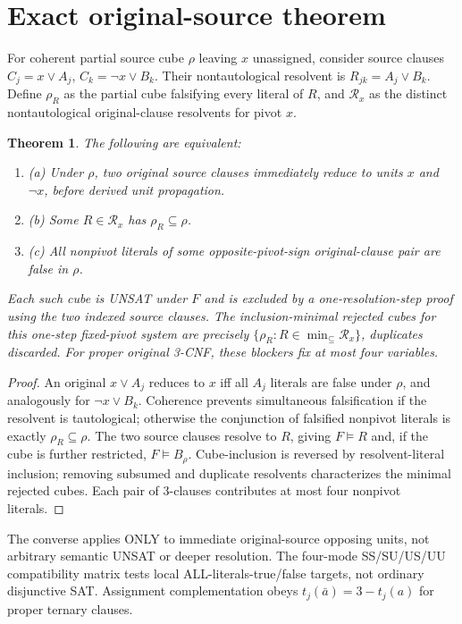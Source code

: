 \documentclass[11pt]{article}
\newtheorem{theorem}{Theorem}
\begin{document}
\section{Exact original-source theorem}
For coherent partial source cube $\rho$ leaving $x$ unassigned, consider source clauses $C_j=x\vee A_j$, $C_k=\neg x\vee B_k$. Their nontautological resolvent is $R_{jk}=A_j\vee B_k$. Define $\rho_R$ as the partial cube falsifying every literal of $R$, and $\mathcal R_x$ as the distinct nontautological original-clause resolvents for pivot $x$.
\begin{theorem}
The following are equivalent:
\begin{enumerate}
\item[] (a) Under $\rho$, two original source clauses immediately reduce to units $x$ and $\neg x$, before derived unit propagation.
\item[] (b) Some $R\in\mathcal R_x$ has $\rho_R\subseteq\rho$.
\item[] (c) All nonpivot literals of some opposite-pivot-sign original-clause pair are false in $\rho$.
\end{enumerate}
Each such cube is UNSAT under $F$ and is excluded by a one-resolution-step proof using the two indexed source clauses. The inclusion-minimal rejected cubes for this one-step fixed-pivot system are precisely $\{\rho_R:R\in\min_{\subseteq}\mathcal R_x\}$, duplicates discarded. For proper original 3-CNF, these blockers fix at most four variables.
\end{theorem}
\begin{proof}
An original $x\vee A_j$ reduces to $x$ iff all $A_j$ literals are false under $\rho$, and analogously for $\neg x\vee B_k$. Coherence prevents simultaneous falsification if the resolvent is tautological; otherwise the conjunction of falsified nonpivot literals is exactly $\rho_R\subseteq\rho$. The two source clauses resolve to $R$, giving $F\models R$ and, if the cube is further restricted, $F\models B_\rho$. Cube-inclusion is reversed by resolvent-literal inclusion; removing subsumed and duplicate resolvents characterizes the minimal rejected cubes. Each pair of 3-clauses contributes at most four nonpivot literals.
\end{proof}
The converse applies ONLY to immediate original-source opposing units, not arbitrary semantic UNSAT or deeper resolution. The four-mode SS/SU/US/UU compatibility matrix tests local ALL-literals-true/false targets, not ordinary disjunctive SAT. Assignment complementation obeys $t_j(\bar a)=3-t_j(a)$ for proper ternary clauses.
\end{document}
